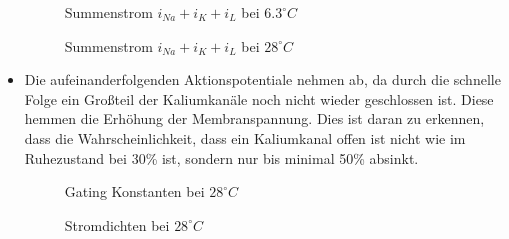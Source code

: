 \documentclass[conference]{IEEEtran}
\begin{document}
\begin{itemize}
\begin{figure}[h!]
  	\centering
    \scalebox{.6}{}
    \caption{Summenstrom $i_{Na}+i_K+i_L$ bei $6.3^\circ C$}
    \label{fig:Summenstrom6}
\end{figure}
\begin{figure}[h!]
  	\centering
    \scalebox{.6}{}
    \caption{Summenstrom $i_{Na}+i_K+i_L$ bei $28^\circ C$}
    \label{fig:Summenstrom28}
\end{figure}



\item Die aufeinanderfolgenden Aktionspotentiale nehmen ab, da durch die schnelle Folge ein Großteil der Kaliumkanäle noch nicht wieder geschlossen ist. Diese hemmen die Erhöhung der Membranspannung. Dies ist daran zu erkennen, dass die Wahrscheinlichkeit, dass ein Kaliumkanal offen ist nicht wie im Ruhezustand bei 30\% ist, sondern nur bis minimal 50\% absinkt.
\begin{figure}[h!]
  	\centering
    \scalebox{.6}{}
    \caption{Gating Konstanten bei $28^\circ C$}
    \label{fig:GatingClose28}
\end{figure}
\begin{figure}[h!]
  	\centering
    \scalebox{.6}{}
    \caption{Stromdichten bei $28^\circ C$}
    \label{fig:StromdichtenClose28}
\end{figure}




\end{itemize}
\end{document}
